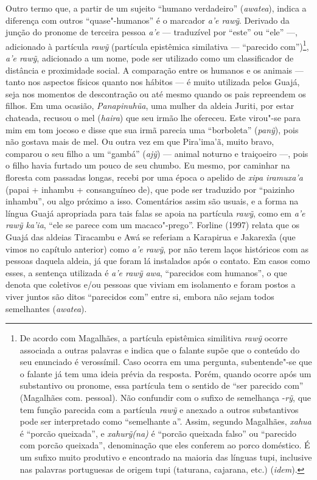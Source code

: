 Outro termo que, a partir de um sujeito ``humano verdadeiro''
(\emph{awatea}), indica a diferença com outros ``quase"-humanos'' é o
marcador \emph{a'e rawỹ}. Derivado da junção do pronome de terceira
pessoa \emph{a'e} --- traduzível por ``este'' ou ``ele'' ---, adicionado à
partícula \emph{rawỹ} (partícula epistêmica similativa --- ``parecido
com'')\footnote{De acordo com Magalhães, a partícula epistêmica similitiva
  \emph{rawỹ} ocorre associada a outras palavras e indica que o falante
  supõe que o conteúdo do seu enunciado é verossímil. Caso ocorra em uma
  pergunta, subentende"-se que o falante já tem uma ideia prévia da
  resposta. Porém, quando ocorre após um substantivo ou pronome, essa
  partícula tem o sentido de ``ser parecido com'' (Magalhães com.
  pessoal). Não confundir com o sufixo de semelhança -\emph{rỹ}, que tem
  função parecida com a partícula \emph{rawỹ} e anexado a outros
  substantivos pode ser interpretado como ``semelhante a''. Assim, segundo
  Magalhães, \emph{xahua} é ``porcão queixada'', e \emph{xahurỹ(na)} é
  ``porcão queixada falso'' ou ``parecido com porcão queixada'', denominação
  que eles conferem ao porco doméstico. É um sufixo muito produtivo e
  encontrado na maioria das línguas tupi, inclusive nas palavras
  portuguesas de origem tupi (taturana, cajarana, etc.) (\emph{idem}).},
\emph{a'e rawỹ}, adicionado a um nome, pode ser utilizado como um
classificador de distância e proximidade social. A comparação entre os
humanos e os animais --- tanto nos aspectos físicos quanto nos hábitos --- é
muito utilizada pelos Guajá, seja nos momentos de descontração ou até
mesmo quando os pais repreendem os filhos. Em uma ocasião,
\emph{Panapinuhũa}, uma mulher da aldeia Juriti, por estar chateada,
recusou o mel (\emph{haira}) que seu irmão lhe ofereceu. Este virou"-se
para mim em tom jocoso e disse que sua irmã parecia uma ``borboleta''
(\emph{panỹ}), pois não gostava mais de mel. Ou outra vez em que
Pira'ima'ã, muito bravo, comparou o seu filho a um ``gambá'' (\emph{ajỹ})
--- animal noturno e traiçoeiro ---, pois o filho havia furtado um pouco de
seu chumbo. Eu mesmo, por caminhar na floresta com passadas longas,
recebi por uma época o apelido de \emph{xipa iramuxa'a} (papai + inhambu
+ consanguíneo de), que pode ser traduzido por ``paizinho inhambu'', ou
algo próximo a isso. Comentários assim são usuais, e a forma na língua
Guajá apropriada para tais falas se apoia na partícula \emph{rawỹ}, como
em \emph{a'e rawỹ ka'ia}, ``ele se parece com um macaco"-prego''. Forline
(1997) relata que os Guajá das aldeias Tiracambu e Awá se referiam a
Karapirua e Jakarexĩa (que vimos no capítulo anterior) como \emph{a'e
rawỹ}, por não terem laços históricos com as pessoas daquela aldeia, já
que foram lá instalados após o contato. Em casos como esses, a sentença
utilizada é \emph{a'e rawỹ awa}, ``parecidos com humanos'', o que denota
que coletivos e/ou pessoas que viviam em isolamento e foram postos a
viver juntos são ditos ``parecidos com'' entre si, embora não sejam todos
semelhantes (\emph{awatea}).

